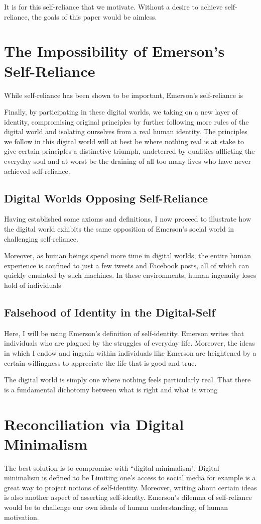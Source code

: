 \documentclass[12pt,letterpaper]{article}
\begin{document}
It is for this self-reliance that we motivate.  Without a desire to achieve self-reliance, the goals of this paper would be aimless.
\fi
\section{The Impossibility of Emerson's Self-Reliance}

While self-reliance has been shown to be important, Emerson's self-reliance is 

Finally, by participating in these digital worlds, we taking on a new layer of identity, compromising original principles by further following more rules of the digital world and isolating ourselves from a real human identity.  The principles we follow in this digital world will at best be where nothing real is at stake to give certain principles a distinctive triumph, undeterred by qualities afflicting the everyday soul and at worst be the draining of all too many lives who have never achieved self-reliance.

\subsection{Digital Worlds Opposing Self-Reliance}
Having established some axioms and definitions, I now proceed to illustrate how the digital world exhibits the same opposition of Emerson's social world in challenging self-reliance. 

Moreover, as human beings spend more time in digital worlds, the entire human experience is confined to just a few tweets and Facebook posts, all of which can quickly emulated by such machines.  In these environments, human ingenuity loses hold of individuals

\subsection{Falsehood of Identity in the Digital-Self}
Here, I will be using Emerson's definition of self-identity.  Emerson writes that individuals who are plagued by the struggles of everyday life.  Moreover, the ideas in which I endow and ingrain within individuals like Emerson are heightened by a certain willingness to appreciate the life that is good and true.

The digital world is simply one where nothing feels particularly real.  That there is a fundamental dichotomy between what is right and what is wrong

\section{Reconciliation via Digital Minimalism}
The best solution is to compromise with ``digital minimalism".  Digital minimalism is defined to be Limiting one's access to social media for example is a great way to project notions of self-identity.  Moreover, writing about certain ideas is also another aspect of asserting self-identty.  
 Emerson's dilemna of self-reliance would be to challenge our own ideals of human understanding, of human motivation.
\end{document}
